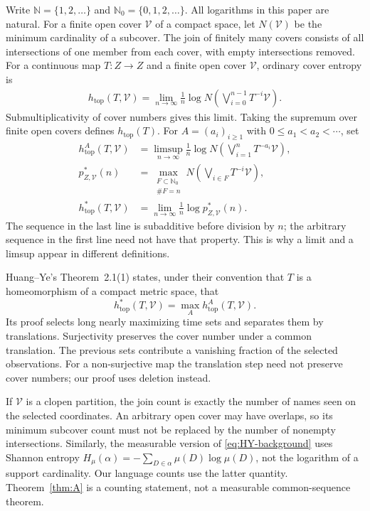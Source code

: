 \documentclass[11pt,reqno]{amsart}
\numberwithin{equation}{section}
\theoremstyle{definition}
\begin{document}
Write $\mathbb N=\{1,2,\ldots\}$ and $\mathbb N_0=\{0,1,2,\ldots\}$.
All logarithms in this paper are natural. For a finite open cover
$\mathcal V$ of a compact space, let $N(\mathcal V)$ be the minimum
cardinality of a subcover. The join of finitely many covers consists of
all intersections of one member from each cover, with empty intersections
removed. For a continuous map $T:Z\to Z$ and a finite open cover
$\mathcal V$, ordinary cover entropy is
\begin{align*}
 h_{\mathrm{top}}(T,\mathcal V)
 =\lim_{n\to\infty}\frac1n\log N\left(
 \bigvee_{i=0}^{n-1}T^{-i}\mathcal V\right).
\end{align*}
Submultiplicativity of cover numbers gives this limit. Taking the
supremum over finite open covers defines $h_{\mathrm{top}}(T)$.
For $A=(a_i)_{i\ge1}$ with $0\le a_1<a_2<\cdots$, set
\begin{align*}
 h_{\mathrm{top}}^A(T,\mathcal V)
 &=\limsup_{n\to\infty}\frac1n\log N\left(
     \bigvee_{i=1}^nT^{-a_i}\mathcal V\right),\\
 p_{Z,\mathcal V}^*(n)
 &=\max_{\substack{F\subset\mathbb N_0\\\#F=n}}
    N\left(\bigvee_{i\in F}T^{-i}\mathcal V\right),\\
 h_{\mathrm{top}}^*(T,\mathcal V)
 &=\lim_{n\to\infty}\frac1n\log p_{Z,\mathcal V}^*(n).
\end{align*}
The sequence in the last line is subadditive before division by $n$;
the arbitrary sequence in the first line need not have that property.
This is why a limit and a limsup appear in different definitions.

Huang--Ye's Theorem~2.1(1) states, under their convention that $T$ is a
homeomorphism of a compact metric space, that
\begin{equation}\label{eq:HY-background}
 h_{\mathrm{top}}^*(T,\mathcal V)
 =\max_A h_{\mathrm{top}}^A(T,\mathcal V).
\end{equation}
Its proof selects long nearly maximizing time sets and separates them
by translations. Surjectivity preserves the cover number under a common
translation. The previous sets contribute a vanishing fraction of the
selected observations. For a non-surjective map the translation step
need not preserve cover numbers; our proof uses deletion instead.

If $\mathcal V$ is a clopen partition, the join count is exactly the
number of names seen on the selected coordinates. An arbitrary open
cover may have overlaps, so its minimum subcover count must not be
replaced by the number of nonempty intersections. Similarly, the
measurable version of \eqref{eq:HY-background} uses Shannon entropy
$H_\mu(\alpha)=-\sum_{D\in\alpha}\mu(D)\log\mu(D)$, not the logarithm
of a support cardinality. Our language counts use the latter quantity.
Theorem~\ref{thm:A} is a counting statement, not a measurable
common-sequence theorem.
\end{document}
